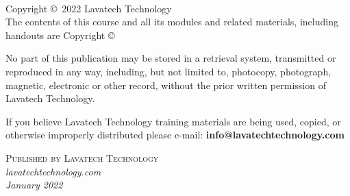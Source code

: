 \documentclass[14pt,fleqn]{extbook} %
\begin{document}

\begingroup
\thispagestyle{empty} %
\vfill
\endgroup


\newpage



~\vfill
\thispagestyle{empty}

\noindent Copyright \copyright\ 2022 Lavatech Technology\\ %

The contents of this course and all its modules and related materials, including handouts are
Copyright ©

No part of this publication may be stored in a retrieval system, transmitted or reproduced in any way, including, but not limited to, photocopy, photograph, magnetic, electronic or other record, without the prior written permission of Lavatech Technology.

If you believe Lavatech Technology training materials are being used, copied, or otherwise improperly distributed please e-mail: 
\newline
\textbf{info@lavatechtechnology.com}

\noindent \textsc{Published by Lavatech Technology}\\ %

\noindent \textit{lavatechtechnology.com}\\ %

%
\noindent \textit{January 2022} %
\end{document}

